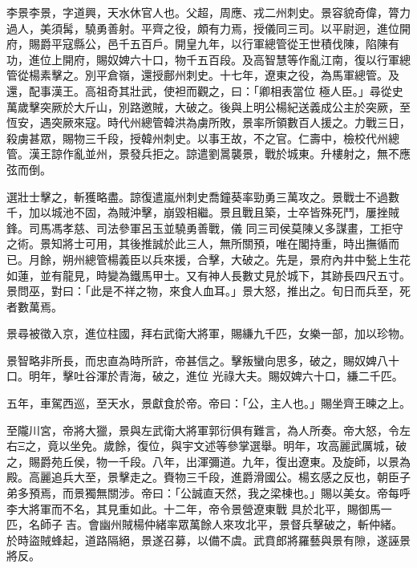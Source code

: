 \begin{pinyinscope}
 李景李景，字道興，天水休官人也。父超，周應、戎二州刺史。景容貌奇偉，膂力過人，美須髯，驍勇善射。平齊之役，頗有力焉，授儀同三司。以平尉迥，進位開府，賜爵平寇縣公，邑千五百戶。開皇九年，以行軍總管從王世積伐陳，陷陳有功，進位上開府，賜奴婢六十口，物千五百段。及高智慧等作亂江南，復以行軍總管從楊素擊之。別平倉嶺，還授鄜州刺史。十七年，遼東之役，為馬軍總管。及還，配事漢王。高祖奇其壯武，使袒而觀之，曰：「卿相表當位
 極人臣。」尋從史萬歲擊突厥於大斤山，別路邀賊，大破之。後與上明公楊紀送義成公主於突厥，至恆安，遇突厥來寇。時代州總管韓洪為虜所敗，景率所領數百人援之。力戰三日，殺虜甚眾，賜物三千段，授韓州刺史。以事王故，不之官。仁壽中，檢校代州總管。漢王諒作亂並州，景發兵拒之。諒遣劉暠襲景，戰於城東。升樓射之，無不應弦而倒。



 選壯士擊之，斬獲略盡。諒復遣嵐州刺史喬鐘葵率勁勇三萬攻之。景戰士不過數千，加以城池不固，為賊沖擊，崩毀相繼。景且戰且築，士卒皆殊死鬥，屢挫賊鋒。司馬馮孝慈、司法參軍呂玉並驍勇善戰，儀
 同三司侯莫陳乂多謀畫，工拒守之術。景知將士可用，其後推誠於此三人，無所關預，唯在閣持重，時出撫循而已。月餘，朔州總管楊義臣以兵來援，合擊，大破之。先是，景府內井中甃上生花如蓮，並有龍見，時變為鐵馬甲士。又有神人長數丈見於城下，其跡長四尺五寸。景問巫，對曰：「此是不祥之物，來食人血耳。」景大怒，推出之。旬日而兵至，死者數萬焉。



 景尋被徵入京，進位柱國，拜右武衛大將軍，賜縑九千匹，女樂一部，加以珍物。



 景智略非所長，而忠直為時所許，帝甚信之。擊叛蠻向思多，破之，賜奴婢八十口。明年，擊吐谷渾於青海，破之，進位
 光祿大夫。賜奴婢六十口，縑二千匹。



 五年，車駕西巡，至天水，景獻食於帝。帝曰：「公，主人也。」賜坐齊王暕之上。



 至隴川宮，帝將大獵，景與左武衛大將軍郭衍俱有難言，為人所奏。帝大怒，令左右Ξ之，竟以坐免。歲餘，復位，與宇文述等參掌選舉。明年，攻高麗武厲城，破之，賜爵苑丘侯，物一千段。八年，出渾彌道。九年，復出遼東。及旋師，以景為殿。高麗追兵大至，景擊走之。賚物三千段，進爵滑國公。楊玄感之反也，朝臣子弟多預焉，而景獨無關涉。帝曰：「公誠直天然，我之梁棟也。」賜以美女。帝每呼李大將軍而不名，其見重如此。十二年，帝令景營遼東戰
 具於北平，賜御馬一匹，名師子吉。會幽州賊楊仲緒率眾萬餘人來攻北平，景督兵擊破之，斬仲緒。於時盜賊蜂起，道路隔絕，景遂召募，以備不虞。武賁郎將羅藝與景有隙，遂誣景將反。




\end{pinyinscope}
